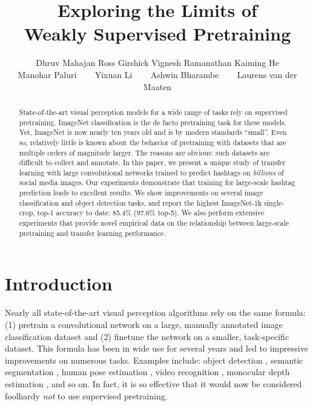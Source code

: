 \documentclass[runningheads]{llncs}
\makeatletter
\newcommand{\etal}{et al.\@\xspace}
\makeatother
\begin{document}
\pagestyle{headings}
\mainmatter
\def\ECCV18SubNumber{1659}  

\title{Exploring the Limits of\\Weakly Supervised Pretraining}



\authorrunning{Mahajan \etal}
\author{Dhruv Mahajan \qquad Ross Girshick \qquad Vignesh Ramanathan \qquad Kaiming He \\ Manohar Paluri ~~~ Yixuan Li ~~~ Ashwin Bharambe ~~~ Laurens van der Maaten}
\maketitle

\begin{abstract}
State-of-the-art visual perception models for a wide range of tasks rely on supervised pretraining. ImageNet classification is the de facto pretraining task for these models. Yet, ImageNet is now nearly ten years old and is by modern standards ``small''. Even so, relatively little is known about the behavior of pretraining with datasets that are multiple orders of magnitude larger. The reasons are obvious: such datasets are difficult to collect and annotate. In this paper, we present a unique study of transfer learning with large convolutional networks trained to predict hashtags on \emph{billions} of social media images. Our experiments demonstrate that training for large-scale hashtag prediction leads to excellent results. We show improvements on several image classification and object detection tasks, and report the highest ImageNet-1k single-crop, top-1 accuracy to date: 85.4\% (97.6\% top-5). We also perform extensive experiments that provide novel empirical data on the relationship between large-scale pretraining and transfer learning performance.
\end{abstract}
 
\section{Introduction}
\label{sec:introduction}

Nearly all state-of-the-art visual perception algorithms rely on the same formula: (1) pretrain a convolutional network on a large, manually annotated image classification dataset and (2) finetune the network on a smaller, task-specific dataset. This formula \cite{Girshick2014,Donahue2013,Zeiler2014} has been in wide use for several years and led to impressive improvements on numerous tasks. Examples include: object detection \cite{Girshick2014,he2017mask}, semantic segmentation \cite{Long2015,Zhao2017}, human pose estimation \cite{Cao_2017_CVPR,Papandreou_2017_CVPR}, video recognition \cite{Carreira_2017_CVPR}, monocular depth estimation \cite{Eigen2015}, and so on. In fact, it is so effective that it would now be considered foolhardy \emph{not} to use supervised pretraining.
\end{document}
